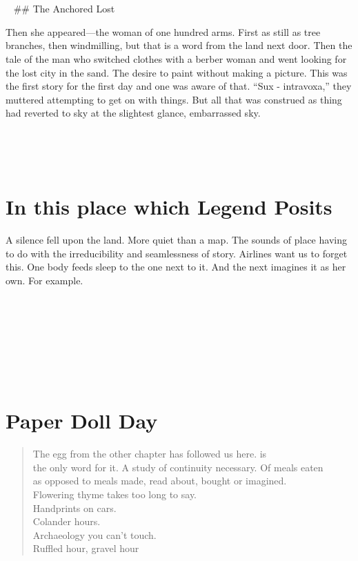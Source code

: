 \documentclass[
]{memoir}
\begin{document}
~

~

~ \#\# The Anchored Lost

Then she appeared---the woman of one hundred arms. First as still as
tree branches, then windmilling, but that is a word from the land next
door. Then the tale of the man who switched clothes with a berber woman
and went looking for the lost city in the sand. The desire to paint
without making a picture. This was the first story for the first day and
one was aware of that. ``Sux - intravoxa,'' they muttered attempting to
get on with things. But all that was construed as thing had reverted to
sky at the slightest glance, embarrassed sky.

~

~

\hypertarget{in-this-place-which-legend-posits}{%
\section*{In this place which Legend
Posits}\label{in-this-place-which-legend-posits}}

A silence fell upon the land. More quiet than a map. The sounds of place
having to do with the irreducibility and seamlessness of story. Airlines
want us to forget this. One body feeds sleep to the one next to it. And
the next imagines it as her own. For example.

~

~

~

~

\hypertarget{paper-doll-day}{%
\section*{Paper Doll Day}\label{paper-doll-day}}

\begin{verse}
The egg from the other chapter has followed us here.  is\\
the only word for it. A study of continuity necessary. Of meals eaten\\
as opposed to meals made, read about, bought or imagined.\\
Flowering thyme takes too long to say.\\
Handprints on cars.\\
Colander hours.\\
Archaeology you can’t touch.\\
Ruffled hour, gravel hour\\
\end{verse}
\end{document}
